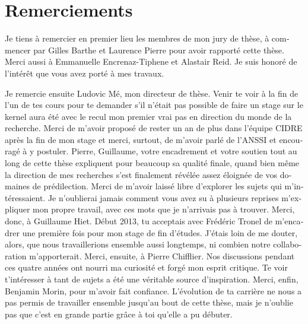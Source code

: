 \chapter*{Remerciements}

\vspace{-0.4cm}

\begin{otherlanguage}{french}
  Je tiens à remercier en premier lieu les membres de mon jury de thèse, à
  commencer par Gilles Barthe et Laurence Pierre pour avoir rapporté cette
  thèse. Merci aussi à Emmanuelle Encrenaz-Tiphene et Alastair Reid. Je suis
  honoré de l’intérêt que vous avez porté à mes travaux.

  Je remercie ensuite Ludovic Mé, mon directeur de thèse. Venir te voir à la fin
  de l’un de tes cours pour te demander s’il n’était pas possible de faire un
  stage \og{}sur le kernel\fg{} aura été avec le recul mon premier vrai pas en
  direction du monde de la recherche. Merci de m’avoir proposé de rester un an
  de plus dans l’équipe CIDRE après la fin de mon stage et merci, surtout, de
  m’avoir parlé de l’ANSSI et encouragé à y postuler.
  Pierre, Guillaume, votre encadrement et votre soutien tout au long de cette
  thèse expliquent pour beaucoup sa qualité finale, quand bien même la direction
  de mes recherches s’est finalement révélée assez éloignée de vos domaines de
  prédilection. Merci de m’avoir laissé libre d’explorer les sujets qui
  m’intéressaient. Je n’oublierai jamais comment vous avez su à plusieurs
  reprises m’expliquer mon propre travail, avec ces mots que je n'arrivais pas à
  trouver.
  Merci, donc, à Guillaume Hiet. Début 2013, tu acceptais avec Frédéric Tronel
  de m’encadrer une première fois pour mon stage de fin d’études. J’étais loin
  de me douter, alors, que nous travaillerions ensemble aussi longtemps, ni
  combien notre collaboration m’apporterait.
  Merci, ensuite, à Pierre Chifflier. Nos discussions pendant ces quatre années
  ont nourri ma curiosité et forgé mon esprit critique. Te voir t’intéresser à
  tant de sujets a été une véritable source d’inspiration.
  Merci, enfin, Benjamin Morin, pour m'avoir fait confiance. L’évolution de ta
  carrière ne nous a pas permis de travailler ensemble jusqu’au bout de cette
  thèse, mais je n’oublie pas que c’est en grande partie grâce à toi qu’elle a
  pu débuter.


\end{otherlanguage}
